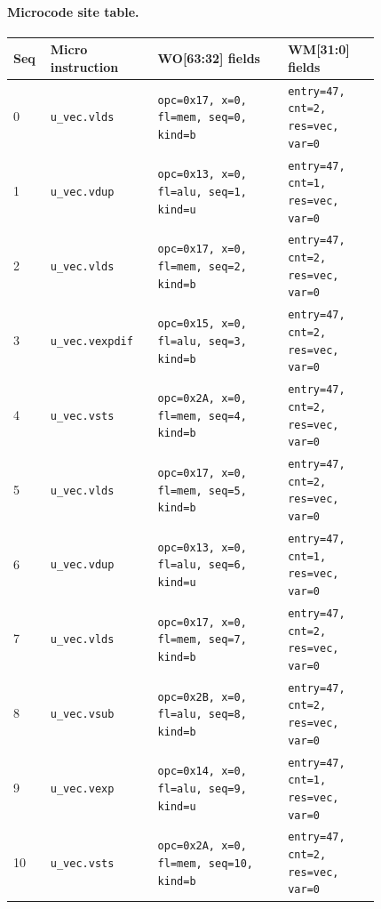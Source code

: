 \paragraph{Microcode site table.}
{\scriptsize
\begin{longtable}{@{}R{0.055\linewidth}L{0.23\linewidth}L{0.31\linewidth}L{0.22\linewidth}@{}}
\toprule
Seq & Micro instruction & WO[63:32] fields & WM[31:0] fields \\
 & \texttt{u\_vec.vlds} & \texttt{opc=0x17, x=0, fl=mem, seq=0, kind=b} & \texttt{entry=47, cnt=2, res=vec, var=0} \\
1 & \texttt{u\_vec.vdup} & \texttt{opc=0x13, x=0, fl=alu, seq=1, kind=u} & \texttt{entry=47, cnt=1, res=vec, var=0} \\
2 & \texttt{u\_vec.vlds} & \texttt{opc=0x17, x=0, fl=mem, seq=2, kind=b} & \texttt{entry=47, cnt=2, res=vec, var=0} \\
3 & \texttt{u\_vec.vexpdif} & \texttt{opc=0x15, x=0, fl=alu, seq=3, kind=b} & \texttt{entry=47, cnt=2, res=vec, var=0} \\
4 & \texttt{u\_vec.vsts} & \texttt{opc=0x2A, x=0, fl=mem, seq=4, kind=b} & \texttt{entry=47, cnt=2, res=vec, var=0} \\
5 & \texttt{u\_vec.vlds} & \texttt{opc=0x17, x=0, fl=mem, seq=5, kind=b} & \texttt{entry=47, cnt=2, res=vec, var=0} \\
6 & \texttt{u\_vec.vdup} & \texttt{opc=0x13, x=0, fl=alu, seq=6, kind=u} & \texttt{entry=47, cnt=1, res=vec, var=0} \\
7 & \texttt{u\_vec.vlds} & \texttt{opc=0x17, x=0, fl=mem, seq=7, kind=b} & \texttt{entry=47, cnt=2, res=vec, var=0} \\
8 & \texttt{u\_vec.vsub} & \texttt{opc=0x2B, x=0, fl=alu, seq=8, kind=b} & \texttt{entry=47, cnt=2, res=vec, var=0} \\
9 & \texttt{u\_vec.vexp} & \texttt{opc=0x14, x=0, fl=alu, seq=9, kind=u} & \texttt{entry=47, cnt=1, res=vec, var=0} \\
10 & \texttt{u\_vec.vsts} & \texttt{opc=0x2A, x=0, fl=mem, seq=10, kind=b} & \texttt{entry=47, cnt=2, res=vec, var=0} \\
\bottomrule
\end{longtable}
}
